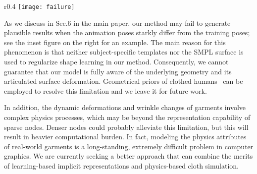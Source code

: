 \begin{wrapfigure}{r}{0.4\linewidth}
\vspace{-2mm}
\hspace{-5mm}
\texttt{[image: failure]}
\end{wrapfigure}
As we discuss in Sec.6 in the main paper, our method may fail to generate plausible results when the animation poses starkly differ from the training poses; see the inset figure on the right for an example. The main reason for this phenomenon is that neither subject-specific templates nor the SMPL surface is used to regularize shape learning in our method. 
Consequently, we cannot guarantee that our model is fully aware of the underlying geometry and its articulated surface deformation. 
Geometrical priors of clothed humans~\cite{Ma:POP:2021} can be employed to resolve this limitation and we leave it for future work. 

In addition, the dynamic deformations and wrinkle changes of garments involve complex physics processes, which may be beyond the representation capability of sparse nodes. Denser nodes could probably alleviate this limitation, but this will result in heavier computational burden. In fact, modeling the physics attributes of real-world garments is a long-standing, extremely difficult problem in computer graphics. We are currently seeking a better approach that can combine the merits of learning-based implicit representations and physics-based cloth simulation. 

